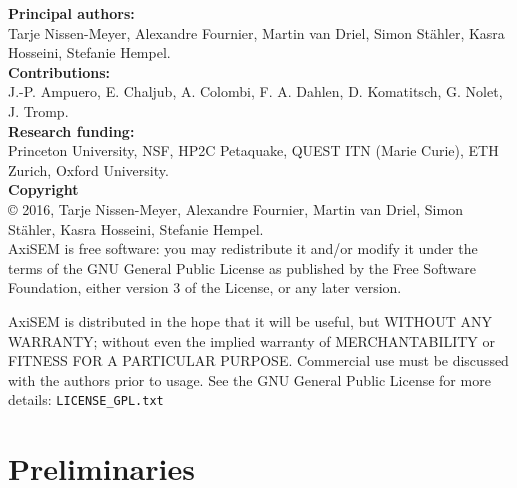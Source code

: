 \documentclass{article}
\begin{document}
%
\noindent \textbf{Principal authors:} \\
Tarje Nissen-Meyer, Alexandre
Fournier, Martin van Driel, Simon St\"{a}hler, Kasra Hosseini, Stefanie Hempel.\vspace*{0.3cm}\\
\noindent \textbf{Contributions:}\\
 J.-P. Ampuero, E. Chaljub, A. Colombi, F. A. Dahlen, D. Komatitsch,
 G. Nolet, J. Tromp.\vspace*{0.3cm}\\
\noindent \textbf{Research funding:} \\Princeton University, NSF, HP2C Petaquake,
QUEST ITN (Marie Curie), ETH Zurich, Oxford University.\vspace*{0.3cm}\\
%
\noindent \textbf{Copyright}\\
\copyright  \hspace*{0.1cm}
2016, Tarje Nissen-Meyer,
Alexandre Fournier, Martin van Driel, Simon St\"{a}hler, Kasra Hosseini, Stefanie Hempel.\vspace*{0.3cm}\\

AxiSEM is free software: you may redistribute it and/or modify it
under the terms of the GNU General Public License as published by the
Free Software Foundation, either version 3 of the License, or any
later version.

AxiSEM is distributed in the hope that it will be useful, but WITHOUT
ANY WARRANTY; without even the implied warranty of MERCHANTABILITY or
FITNESS FOR A PARTICULAR PURPOSE. Commercial use must be discussed
with the authors prior to usage. See the GNU General Public License
for more details: \verb|LICENSE_GPL.txt|
\newpage
\tableofcontents
%
\vspace*{1cm}

\section{Preliminaries}
% 
\end{document}
